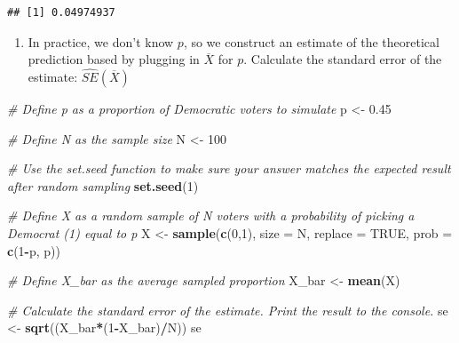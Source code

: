 \documentclass[
]{article}
\newenvironment{Shaded}{\begin{snugshade}}{\end{snugshade}}
\newcommand{\CommentTok}[1]{\textcolor[rgb]{0.56,0.35,0.01}{\textit{#1}}}
\newcommand{\DataTypeTok}[1]{\textcolor[rgb]{0.13,0.29,0.53}{#1}}
\newcommand{\DecValTok}[1]{\textcolor[rgb]{0.00,0.00,0.81}{#1}}
\newcommand{\FloatTok}[1]{\textcolor[rgb]{0.00,0.00,0.81}{#1}}
\newcommand{\KeywordTok}[1]{\textcolor[rgb]{0.13,0.29,0.53}{\textbf{#1}}}
\newcommand{\NormalTok}[1]{#1}
\newcommand{\OperatorTok}[1]{\textcolor[rgb]{0.81,0.36,0.00}{\textbf{#1}}}
\newcommand{\OtherTok}[1]{\textcolor[rgb]{0.56,0.35,0.01}{#1}}
\newcommand{\StringTok}[1]{\textcolor[rgb]{0.31,0.60,0.02}{#1}}
\providecommand{\tightlist}{%
  \setlength{\itemsep}{0pt}\setlength{\parskip}{0pt}}
\begin{document}
\begin{verbatim}
## [1] 0.04974937
\end{verbatim}

\begin{enumerate}
\def\labelenumi{\arabic{enumi}.}
\setcounter{enumi}{6}
\tightlist
\item
  In practice, we don't know \(p\), so we construct an estimate of the
  theoretical prediction based by plugging in \(\overline{X}\) for
  \(p\). Calculate the standard error of the estimate:
  \(\hat{SE}(\overline{X})\)
\end{enumerate}

\begin{Shaded}
\begin{Highlighting}[]
\CommentTok{\# Define \textasciigrave{}p\textasciigrave{} as a proportion of Democratic voters to simulate}
\NormalTok{p \textless{}{-}}\StringTok{ }\FloatTok{0.45}

\CommentTok{\# Define \textasciigrave{}N\textasciigrave{} as the sample size}
\NormalTok{N \textless{}{-}}\StringTok{ }\DecValTok{100}

\CommentTok{\# Use the \textasciigrave{}set.seed\textasciigrave{} function to make sure your answer matches the expected result after random sampling}
\KeywordTok{set.seed}\NormalTok{(}\DecValTok{1}\NormalTok{)}

\CommentTok{\# Define \textasciigrave{}X\textasciigrave{} as a random sample of \textasciigrave{}N\textasciigrave{} voters with a probability of picking a Democrat (\textquotesingle{}1\textquotesingle{}) equal to \textasciigrave{}p\textasciigrave{}}
\NormalTok{X \textless{}{-}}\StringTok{ }\KeywordTok{sample}\NormalTok{(}\KeywordTok{c}\NormalTok{(}\DecValTok{0}\NormalTok{,}\DecValTok{1}\NormalTok{), }\DataTypeTok{size =}\NormalTok{ N, }\DataTypeTok{replace =} \OtherTok{TRUE}\NormalTok{, }\DataTypeTok{prob =} \KeywordTok{c}\NormalTok{(}\DecValTok{1}\OperatorTok{{-}}\NormalTok{p, p))}

\CommentTok{\# Define \textasciigrave{}X\_bar\textasciigrave{} as the average sampled proportion}
\NormalTok{X\_bar \textless{}{-}}\StringTok{ }\KeywordTok{mean}\NormalTok{(X)}

\CommentTok{\# Calculate the standard error of the estimate. Print the result to the console.}
\NormalTok{se \textless{}{-}}\StringTok{ }\KeywordTok{sqrt}\NormalTok{((X\_bar}\OperatorTok{*}\NormalTok{(}\DecValTok{1}\OperatorTok{{-}}\NormalTok{X\_bar)}\OperatorTok{/}\NormalTok{N))}
\NormalTok{se}
\end{Highlighting}
\end{Shaded}
\end{document}

